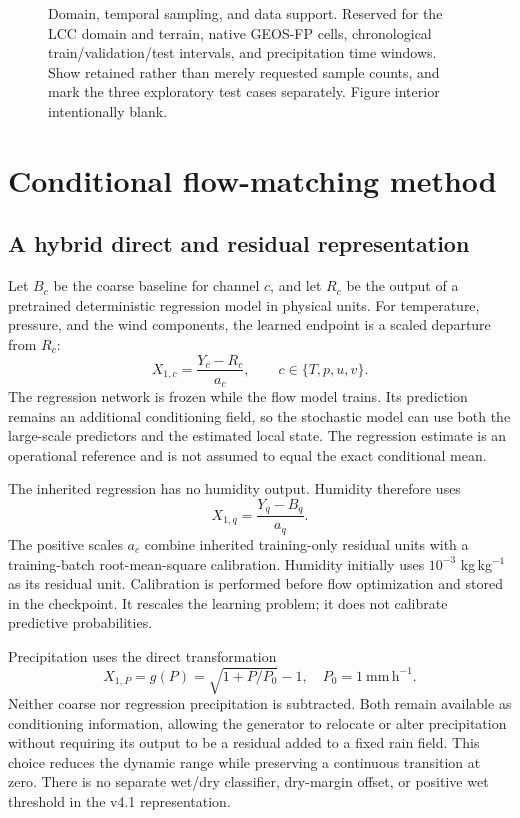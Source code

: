 \documentclass[10pt]{article}
\newcommand{\rainunit}{\mathrm{mm\,h^{-1}}}
\newcommand{\blankpanel}[1]{\begingroup\setlength{\fboxsep}{0pt}\color{rulegray}\fbox{\rule{0pt}{#1}\rule{\dimexpr\linewidth-2\fboxrule\relax}{0pt}}\endgroup}
\newcommand{\figslot}[3]{\begin{figure}[t]\centering\blankpanel{#1}\caption{#2}\label{#3}\end{figure}}
\begin{document}
\figslot{4.0cm}{Domain, temporal sampling, and data support. Reserved for the LCC domain and terrain, native GEOS-FP cells, chronological train/validation/test intervals, and precipitation time windows. Show retained rather than merely requested sample counts, and mark the three exploratory test cases separately. Figure interior intentionally blank.}{fig:data}

\section{Conditional flow-matching method}\label{sec:method}
\subsection{A hybrid direct and residual representation}
Let $B_c$ be the coarse baseline for channel $c$, and let $R_c$ be the output of a pretrained deterministic regression model in physical units. For temperature, pressure, and the wind components, the learned endpoint is a scaled departure from $R_c$:
\begin{equation}
X_{1,c}=\frac{Y_c-R_c}{a_c},
\qquad c\in\{T,p,u,v\}.
\label{eq:state}
\end{equation}
The regression network is frozen while the flow model trains. Its prediction remains an additional conditioning field, so the stochastic model can use both the large-scale predictors and the estimated local state. The regression estimate is an operational reference and is not assumed to equal the exact conditional mean.

The inherited regression has no humidity output. Humidity therefore uses
\begin{equation}
X_{1,q}=\frac{Y_q-B_q}{a_q}.
\label{eq:q}
\end{equation}
The positive scales $a_c$ combine inherited training-only residual units with a training-batch root-mean-square calibration. Humidity initially uses $10^{-3}$ kg\,kg$^{-1}$ as its residual unit. Calibration is performed before flow optimization and stored in the checkpoint. It rescales the learning problem; it does not calibrate predictive probabilities.

Precipitation uses the direct transformation
\begin{equation}
X_{1,P}=g(P)=\sqrt{1+P/P_0}-1,
\quad P_0=1~\rainunit.
\label{eq:rain}
\end{equation}
Neither coarse nor regression precipitation is subtracted. Both remain available as conditioning information, allowing the generator to relocate or alter precipitation without requiring its output to be a residual added to a fixed rain field. This choice reduces the dynamic range while preserving a continuous transition at zero. There is no separate wet/dry classifier, dry-margin offset, or positive wet threshold in the v4.1 representation.
\end{document}

